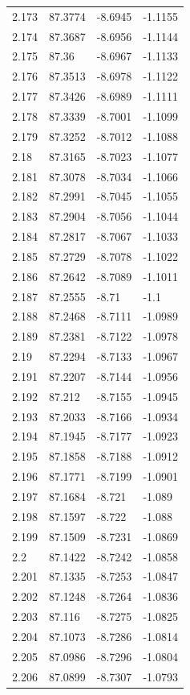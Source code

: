 \begin{tabular}{llll}
2.173 & 87.3774 & -8.6945 & -1.1155 \\
2.174 & 87.3687 & -8.6956 & -1.1144 \\
2.175 & 87.36 & -8.6967 & -1.1133 \\
2.176 & 87.3513 & -8.6978 & -1.1122 \\
2.177 & 87.3426 & -8.6989 & -1.1111 \\
2.178 & 87.3339 & -8.7001 & -1.1099 \\
2.179 & 87.3252 & -8.7012 & -1.1088 \\
2.18 & 87.3165 & -8.7023 & -1.1077 \\
2.181 & 87.3078 & -8.7034 & -1.1066 \\
2.182 & 87.2991 & -8.7045 & -1.1055 \\
2.183 & 87.2904 & -8.7056 & -1.1044 \\
2.184 & 87.2817 & -8.7067 & -1.1033 \\
2.185 & 87.2729 & -8.7078 & -1.1022 \\
2.186 & 87.2642 & -8.7089 & -1.1011 \\
2.187 & 87.2555 & -8.71 & -1.1 \\
2.188 & 87.2468 & -8.7111 & -1.0989 \\
2.189 & 87.2381 & -8.7122 & -1.0978 \\
2.19 & 87.2294 & -8.7133 & -1.0967 \\
2.191 & 87.2207 & -8.7144 & -1.0956 \\
2.192 & 87.212 & -8.7155 & -1.0945 \\
2.193 & 87.2033 & -8.7166 & -1.0934 \\
2.194 & 87.1945 & -8.7177 & -1.0923 \\
2.195 & 87.1858 & -8.7188 & -1.0912 \\
2.196 & 87.1771 & -8.7199 & -1.0901 \\
2.197 & 87.1684 & -8.721 & -1.089 \\
2.198 & 87.1597 & -8.722 & -1.088 \\
2.199 & 87.1509 & -8.7231 & -1.0869 \\
2.2 & 87.1422 & -8.7242 & -1.0858 \\
2.201 & 87.1335 & -8.7253 & -1.0847 \\
2.202 & 87.1248 & -8.7264 & -1.0836 \\
2.203 & 87.116 & -8.7275 & -1.0825 \\
2.204 & 87.1073 & -8.7286 & -1.0814 \\
2.205 & 87.0986 & -8.7296 & -1.0804 \\
2.206 & 87.0899 & -8.7307 & -1.0793 \\

\end{tabular}
